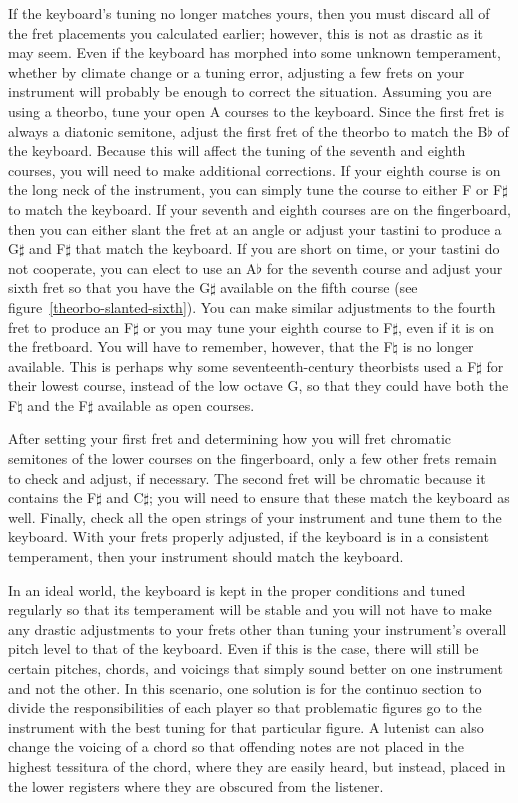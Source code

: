 If the keyboard's tuning no longer matches yours, then you must discard all of the fret placements you calculated
earlier; however, this is not as drastic as it may seem. Even if the keyboard has morphed into some unknown temperament,
whether by climate change or a tuning error, adjusting a few frets on your instrument will probably be enough to correct
the situation. Assuming you are using a theorbo, tune your open A courses to the keyboard. Since the first fret is
always a diatonic semitone, adjust the first fret of the theorbo to match the B$\flat$ of the keyboard. Because this
will affect the tuning of the seventh and eighth courses, you will need to make additional corrections. If your eighth
course is on the long neck of the instrument, you can simply tune the course to either F or F$\sharp$ to match the
keyboard. If your seventh and eighth courses are on the fingerboard, then you can either slant the fret at an angle or
adjust your tastini to produce a G$\sharp$ and F$\sharp$ that match the keyboard. If you are short on time, or your
tastini do not cooperate, you can elect to use an A$\flat$ for the seventh course and adjust your sixth fret so that you
have the G$\sharp$ available on the fifth course (see figure~\ref{theorbo-slanted-sixth}). You can make similar
adjustments to the fourth fret to produce an F$\sharp$ or you may tune your eighth course to F$\sharp$, even if it is on
the fretboard. You will have to remember, however, that the F$\natural$ is no longer available. This is perhaps why some
seventeenth-century theorbists used a F$\sharp$ for their lowest course, instead of the low octave G, so that they could
have both the F$\natural$ and the F$\sharp$ available as open courses.

After setting your first fret and determining how you will fret chromatic semitones of the lower courses on the
fingerboard, only a few other frets remain to check and adjust, if necessary. The second fret will be chromatic because
it contains the F$\sharp$ and C$\sharp$; you will need to ensure that these match the keyboard as well. Finally, check
all the open strings of your instrument and tune them to the keyboard. With your frets properly adjusted, if the
keyboard is in a consistent temperament, then your instrument should match the keyboard.

In an ideal world, the keyboard is kept in the proper conditions and tuned regularly so that its temperament will be
stable and you will not have to make any drastic adjustments to your frets other than tuning your instrument's overall
pitch level to that of the keyboard. Even if this is the case, there will still be certain pitches, chords, and voicings
that simply sound better on one instrument and not the other. In this scenario, one solution is for the continuo section
to divide the responsibilities of each player so that problematic figures go to the instrument with the best tuning for
that particular figure. A lutenist can also change the voicing of a chord so that offending notes are not placed in the
highest tessitura of the chord, where they are easily heard, but instead, placed in the lower registers where they are
obscured from the listener.

